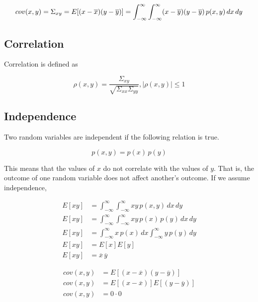 \begin{equation*}
  cov(x, y) = \Sigma_{xy} = E[(x - \overline{x})(y - \overline{y})] =
    \int_{-\infty}^\infty \int_{-\infty}^\infty (x - \overline{y})
    (y - \overline{y}) \,p(x, y) \,dx \,dy \\
\end{equation*}

\subsection{Correlation}

Correlation is defined as

\begin{equation*}
  \rho(x, y) = \frac{\Sigma_{xy}}{\sqrt{\Sigma_{xx}\Sigma_{yy}}}, |\rho(x, y)|
    \leq 1
\end{equation*}

\subsection{Independence}

Two random variables are independent if the following relation is true.

\begin{equation*}
  p(x, y) = p(x) \,p(y)
\end{equation*}

This means that the values of $x$ do not correlate with the values of $y$. That
is, the outcome of one random variable does not affect another's outcome. If we
assume independence,

\begin{align*}
  E[xy] &= \int_{-\infty}^\infty \int_{-\infty}^\infty xy \,p(x, y) \,dx \,dy \\
  E[xy] &= \int_{-\infty}^\infty \int_{-\infty}^\infty xy \,p(x) \,p(y) \,dx
    \,dy \\
  E[xy] &= \int_{-\infty}^\infty x \,p(x) \,dx \int_{-\infty}^\infty y \,p(y)
    \,dy \\
  E[xy] &= E[x]E[y] \\
  E[xy] &= \overline{x}\,\overline{y}
\end{align*}

\begin{align*}
  cov(x, y) &= E[(x - \overline{x})(y - \overline{y})] \\
  cov(x, y) &= E[(x - \overline{x})]E[(y - \overline{y})] \\
  cov(x, y) &= 0 \cdot 0 \\
\end{align*}

